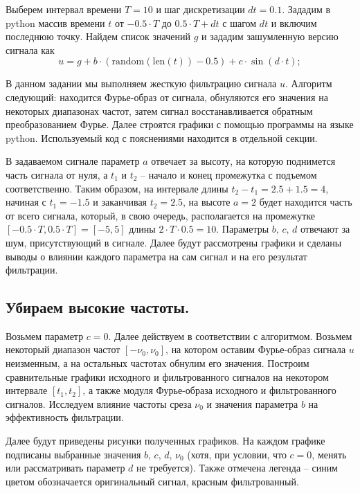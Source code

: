\documentclass[a4paper, 12pt]{article}
\begin{document}
    Выберем интервал времени $T=10$ и шаг дискретизации $dt=0.1$. Зададим в python массив времени $t$ от $-0.5\cdot T$ до $0.5\cdot T+dt$
    с шагом $dt$ и включим последнюю точку. Найдем список значений $g$ и зададим зашумленную версию сигнала как
    $$
    u=g+b\cdot(\text{random}(\text{len}(t))-0.5) + c\cdot \sin(d\cdot t);
    $$


    В данном задании мы выполняем жесткую фильтрацию сигнала $u$. Алгоритм следующий: находится Фурье-образ от сигнала,
    обнуляются его значения на некоторых диапазонах частот, затем сигнал восстанавливается обратным преобразованием Фурье.
    Далее строятся графики с помощью программы на языке python. Используемый код с пояснениями находится в отдельной секции.


    В задаваемом сигнале параметр $a$ отвечает за высоту, на которую поднимется часть сигнала от нуля, а $t_1 \text{ и } t_2$ -- начало
    и конец промежутка с подъемом соответственно. Таким образом, на интервале длины $t_2-t_1=2.5+1.5=4$, начиная с $t_1=-1.5$ и заканчивая $t_2=2.5$,
    на высоте $a=2$ будет находится часть от всего сигнала, который, в свою очередь, располагается на промежутке $[-0.5\cdot T,0.5\cdot T]=[-5,5]$
    длины $2\cdot T\cdot 0.5=10$. Параметры $b,\,c,\,d$ отвечают за шум, присутствующий в сигнале. Далее будут рассмотрены графики и сделаны выводы о
    влиянии каждого параметра на сам сигнал и на его результат фильтрации.


    \subsection{Убираем высокие частоты.}
    Возьмем параметр $c=0$. Далее действуем в соответствии с алгоритмом. Возьмем некоторый диапазон частот $[-\nu_0, \nu_0]$, на котором оставим Фурье-образ
    сигнала $u$ неизменным, а на остальных частотах обнулим его значения. Построим сравнительные графики исходного и фильтрованного сигналов на некотором
    интервале $[t_1,t_2]$, а также модуля Фурье-образа исходного и фильтрованного сигналов. Исследуем влияние частоты среза $\nu_0$ и значения параметра $b$
    на эффективность фильтрации.
    
    
    Далее будут приведены рисунки полученных графиков. На каждом графике подписаны выбранные значения $b,\,c,\,d,\,\nu_0$
    (хотя, при условии, что $c=0$, менять или рассматривать параметр $d$ не требуется). Также отмечена легенда -- синим цветом
    обозначается оригинальный сигнал, красным фильтрованный.
\end{document}
